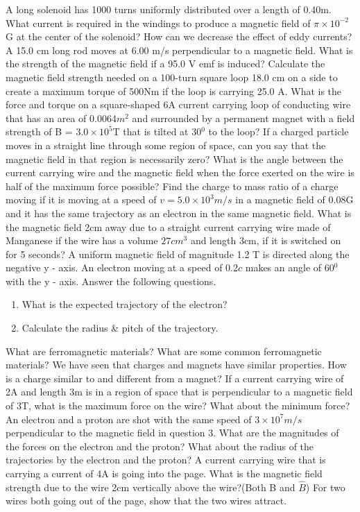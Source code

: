 \documentclass[12pt,addpoints]{exam}
\begin{document}
\begin{questions}
		\question A long solenoid has 1000 turns uniformly distributed over a length of 0.40m. What current is required in the windings to produce a magnetic field of $\pi\times10^{-2}$G at the center of the solenoid?
		\question How can we decrease the effect of eddy currents?
		\question A 15.0 cm long rod moves at 6.00 m/s perpendicular to a magnetic field. What is the strength of the magnetic field if a 95.0 V emf is induced?
		\question Calculate the magnetic field strength needed on a 100-turn square loop 18.0 cm on a side to create a maximum torque of
		500Nm if the loop is carrying 25.0 A.
		\question What is the force and torque on a square-shaped 6A current carrying loop of conducting wire that has an area of 0.0064$m^2$ and surrounded by a permanent magnet with a field strength of B = $3.0\times10^5$T that is tilted at 30$^0$ to the loop?
		\question If a charged particle moves in a straight line through some region of space, can you say that the magnetic field in that region is necessarily zero?
		\question What is the angle between the current carrying wire and the magnetic field when the force exerted on the wire is half of the maximum force possible?
		\question Find the charge to mass ratio of a charge moving if it is moving at a speed of $v = 5.0\times10^3 m/s$ in a magnetic field of 0.08G and it has the same trajectory as an electron in the same magnetic field.
		\question What is the magnetic field 2cm away due to a straight current carrying wire made of Manganese if the wire has a volume $27cm^3$ and length 3cm, if it is switched on for 5 seconds?
		\question A uniform magnetic field of magnitude 1.2 T is directed along the negative y - axis. An electron moving at a speed of 0.2$c$ makes an angle of 60$^0$ with the y - axis. Answer the following questions.
		\begin{enumerate}[label=(\roman*)]
			\item What is the expected trajectory of the electron?
			\item Calculate the radius \& pitch of the trajectory.
		\end{enumerate}
		\question What are ferromagnetic materials? What are some common ferromagnetic materials?
		\question We have seen that charges and magnets have similar properties. How is a charge similar to and different from a magnet?
		\question If a current carrying wire of 2A and length 3m is in a region of space that is perpendicular to a magnetic field of 3T, what is the maximum force on the wire? What about the minimum force?
		\question An electron and a proton are shot with the same speed of $3\times10^7m/s$ perpendicular to the magnetic field in question 3. What are the magnitudes of the forces on the electron and the proton? What about the radius of the trajectories by the electron and the proton?
		\question A current carrying wire that is carrying a current of 4A is going into the page. What is the magnetic field strength due to the wire 2cm vertically above the wire?(Both B and $\hat{B}$)
		\question For two wires both going out of the page, show that the two wires attract.
	\end{questions}		
\end{document}
